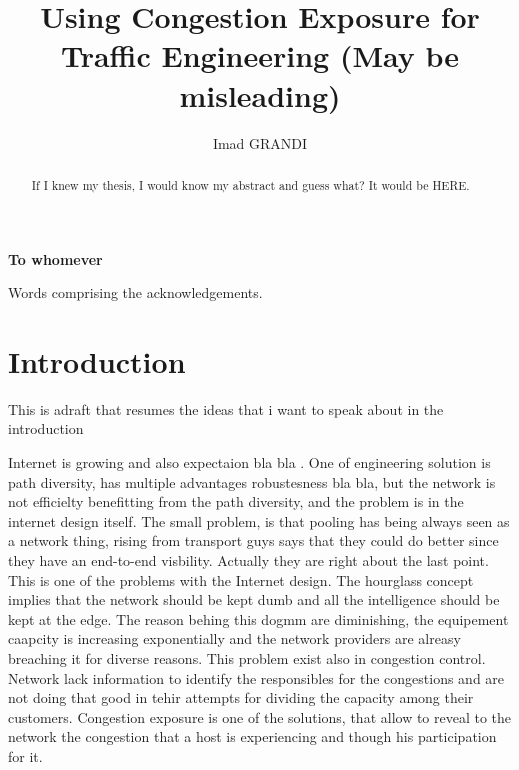 \documentclass[mres, **20pt**]{ucl_thesis}
\title{Using Congestion Exposure for Traffic Engineering (May be misleading)}
\author{Imad GRANDI}
\begin{document}
\maketitle

\clearpage
\clearpage
\fontsize{12}{15}
\selectfont
\begin{center}
\textbf{To whomever}
\end{center}

\begin{abstract}
If I knew my thesis, I would know my abstract and guess what? It
would be HERE.
\end{abstract}

\begin{acknowledgements}
Words comprising the acknowledgements.
\end{acknowledgements}

\setcounter{tocdepth}{2}
\tableofcontents
\listoffigures
\listoftables


\chapter{Introduction}
This is adraft that resumes the ideas that i want to speak about in the introduction

Internet is growing and also expectaion bla bla . One of  engineering solution is path diversity, has multiple advantages robustesness bla bla, but the network is not efficielty benefitting from the path diversity, and the problem is in the internet design itself. The small problem, is that pooling has being always seen as a network thing, rising from transport guys says that they could do better since they have an end-to-end visbility. Actually they are right about the last point. This is one of the problems with the Internet design. The hourglass concept implies that the network should be kept dumb and all the intelligence should be kept at the edge. The reason behing this dogmm are diminishing, the equipement caapcity is increasing exponentially and the network providers are alreasy breaching it for diverse reasons. This problem exist also in congestion control. Network lack  information to identify the responsibles for the congestions and are not doing that good in tehir attempts for dividing the capacity among their customers. Congestion exposure is one of the solutions, that allow to reveal to the network the congestion that a host is experiencing and though his participation for it.
\end{document}
